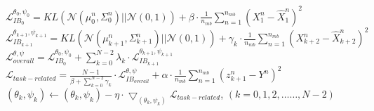 \begin{algorithm}[htb]
\begin{algorithmic}
        \EndFor
         \State $\mathcal{L} _{IB_{0} }^{\theta _{0},\psi _{0} } =KL\left ( \mathcal{N}\left ( \mu _{0}^{n} ,\Sigma _{0}^{n}  \right )|| \mathcal{N}\left ( 0,1  \right )  \right )+\beta \cdot \frac{1}{n_{mb} }\sum_{n=1}^{n_{mb}}\left ( X_{1}^{n}-\hat{X}_{1}^{n}  \right )^{2}$
            \State $\mathcal{L} _{IB_{k+1} }^{\theta _{k+1},\psi _{k+1} } =KL\left ( \mathcal{N}\left ( \mu _{k+1}^{n} ,\Sigma _{k+1}^{n}  \right )|| \mathcal{N}\left ( 0,1  \right )  \right )+\gamma_{k}  \cdot \frac{1}{n_{mb} }\sum_{n=1}^{n_{mb}}\left ( X_{k+2}^{n}-\hat{X}_{k+2}^{n}  \right )^{2}$
        \EndFor
    \EndIf
   \State $\mathcal{L} _{overall}^{\theta ,\psi }  = \mathcal{L}_{IB_{0}}^{\theta _{0},\psi _{0} } + \sum_{k=0}^{N-2} \lambda_{k} \cdot \mathcal{L}_{IB_{k+1}}^{\theta _{k+1},\psi _{k+1} } $
   \State $\mathcal{L} _{task-related}  =\frac{N-1}{\beta +\sum_{k=0}^{N-2} \gamma_{k}  } \cdot \mathcal{L}_{IB_{overall}}^{\theta ,\psi} + \alpha\cdot\frac{1}{n_{mb} }\sum_{n=1}^{n_{mb}}\left ( z_{k+1}^{n}-Y^{n}  \right )^{2}  $
   \State $( \theta _{k} ,\psi _{k} ) \longleftarrow ( \theta _{k} ,\psi _{k} ) -\eta\cdot \bigtriangledown _( \theta _{k} ,\psi _{k} )\mathcal{L} _{task-related}$, $(k = 0,1,2,\dots \dots, N-2 )$
    \end{algorithmic}
\end{algorithm}